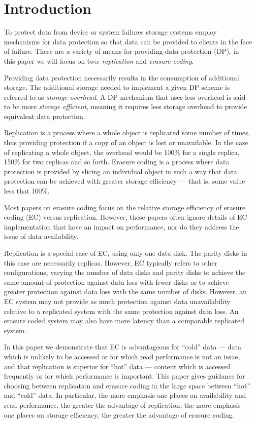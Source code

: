 \section{Introduction}

To protect data from device or system failures storage systems employ mechanisms for data protection so that data can be provided to clients in the face of failure. There are a variety of means for providing data protection (DP), in this paper we will focus on two: \emph{replication} and \emph{erasure coding}. 

Providing data protection necessarily results in the consumption of additional storage. The additional storage needed to implement a given DP scheme is referred to as \emph{storage overhead}. A DP mechanism that uses less overhead is said to be more \emph{storage efficient}, meaning it requires less storage overhead to provide equivalent data protection. 

Replication is a process where a whole object is replicated some number of times, thus providing protection if a copy of an object is lost or unavailable. In the case of replicating a whole object, the overhead would be 100\% for a single replica, 150\% for two replicas and so forth. Erasure coding is a process where data protection is provided by slicing an individual object in such a way that data protection can be achieved with greater storage efficiency --- that is, some value less that 100\%.  

Most papers on erasure coding focus on the relative storage efficiency of erasure coding (EC) versus replication. However, these papers often ignore details of EC implementation that have an impact on performance, nor do they address the issue of data availability. 

Replication is a special case of EC, using only one data disk. The parity disks in this case are necessarily replicas. However, EC typically refers to other configurations, varying the number of data disks and parity disks to achieve the same amount of protection against data loss with fewer disks or to achieve greater protection against data loss with the same number of disks. However, an EC system may not provide as much protection against data unavailability relative to a replicated system with the same protection against data loss. An erasure coded system may also have more latency than a comparable replicated system.

In this paper we demonstrate that EC is advantageous for ``cold'' data --- data which is unlikely to be accessed or for which read performance is not an issue, and that replication is superior for ``hot'' data --- content which is accessed frequently or for which performance is important. This paper gives guidance for choosing between replication and erasure coding in the large space between ``hot'' and ``cold'' data. In particular, the more emphasis one places on availability and read performance, the greater the advantage of replication; the more emphasis one places on storage efficiency, the greater the advantage of erasure coding. 

